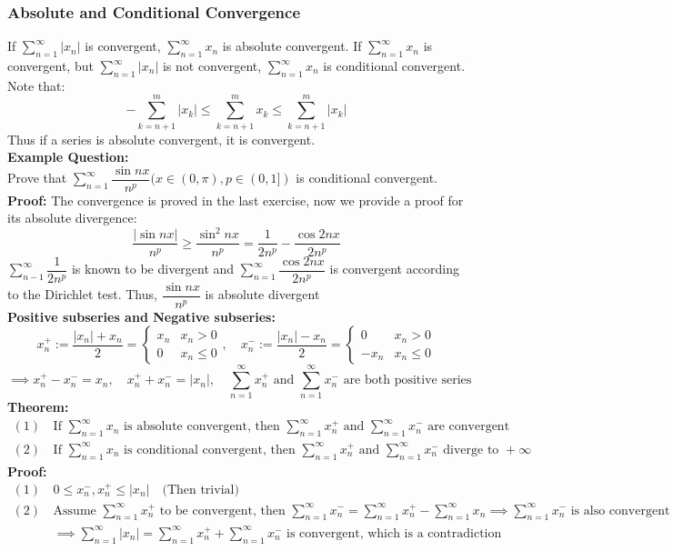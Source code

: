 \documentclass{article}
\newcommand{\0}{{\bf{0}}}
\begin{document}
\subsubsection{Absolute and Conditional Convergence}
If $\sum\limits_{n=1}^\infty |x_n|$ is convergent, $\sum\limits_{n=1}^\infty x_n$ is absolute convergent. If $\sum\limits_{n=1}^\infty x_n$ is convergent, but $\sum\limits_{n=1}^\infty |x_n|$ is not convergent, $\sum\limits_{n=1}^\infty x_n$ is conditional convergent. Note that:
$$-\sum\limits_{k=n+1}^m|x_k|\le\sum\limits_{k=n+1}^mx_k\le\sum\limits_{k=n+1}^m|x_k|$$
Thus if a series is absolute convergent, it is convergent.\\
\textbf{Example Question:}\\
Prove that $\sum\limits_{n=1}^\infty\dfrac{\sin nx}{n^p}(x\in(0,\pi),p\in(0,1])$ is conditional convergent.\\
\textbf{Proof:}
The convergence is proved in the last exercise, now we provide a proof for its absolute divergence:
$$\dfrac{|\sin nx|}{n^p}\geq\dfrac{\sin^2nx}{n^p}=\dfrac{1}{2n^p}-\dfrac{\cos2nx}{2n^p}$$
$\sum\limits_{n-1}^\infty\dfrac{1}{2n^p}$ is known to be divergent and $\sum\limits_{n=1}^\infty\dfrac{\cos2nx}{2n^p}$ is convergent according to the Dirichlet test. Thus, $\dfrac{\sin nx}{n^p}$ is absolute divergent\\
\textbf{Positive subseries and Negative subseries:}
$$x_n^+:=\frac{|x_n|+x_n}{2}=\begin{cases}
   x_n&x_n>0\\
   0&x_n\le0
\end{cases},\quad x_n^-:=\frac{|x_n|-x_n}{2}=\begin{cases}
   0&x_n>0\\
   -x_n&x_n\le0
\end{cases}$$
$$\implies x_n^+-x_n^-=x_n,\quad x_n^++x_n^-=|x_n|,\quad\sum_{n=1}^\infty x_n^+\mbox{ and }\sum_{n=1}^\infty x_n^-\mbox{ are both positive series}$$
\textbf{Theorem:}
\begin{equation}
\begin{split}
    (1)\,&\mbox{If }\sum_{n=1}^\infty x_n\mbox{ is absolute convergent, then }\sum_{n=1}^\infty x_n^+\mbox{ and }\sum_{n=1}^\infty x_n^-\mbox{ are convergent}\\
    (2)\,&\mbox{If }\sum_{n=1}^\infty x_n\mbox{ is conditional convergent, then }\sum_{n=1}^\infty x_n^+\mbox{ and }\sum_{n=1}^\infty x_n^-\mbox{ diverge to }+\infty
\end{split}
\end{equation}
\textbf{Proof:}
\begin{equation}
\begin{split}
    (1)\,&0\le x_n^-,x_n^+\le|x_n|\quad\mbox{(Then trivial)}\\
    (2)\,&\mbox{Assume }\sum_{n=1}^\infty x_n^+\mbox{ to be convergent, then }\sum_{n=1}^\infty x_n^-=\sum_{n=1}^\infty x_n^+-\sum_{n=1}^\infty x_n\implies \sum_{n=1}^\infty x_n^-\mbox{ is also convergent}\\
    &\implies \sum_{n=1}^\infty|x_n|=\sum_{n=1}^\infty x_n^++\sum_{n=1}^\infty x_n^-\mbox{ is convergent, which is a contradiction}
\end{split}
\end{equation}
\end{document}
